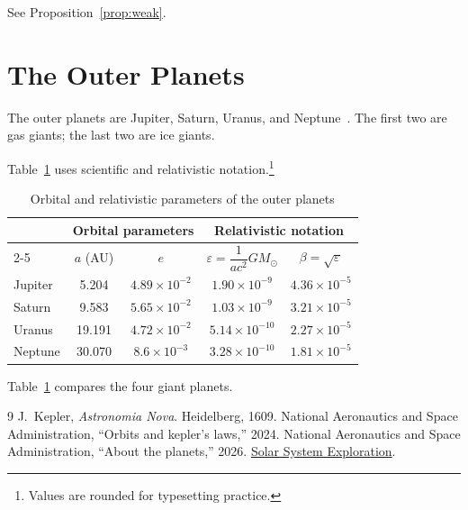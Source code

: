 \documentclass[10pt]{article}
\begin{document}
See Proposition~\ref{prop:weak}.

\section{The Outer Planets}
The outer planets are Jupiter, Saturn, Uranus, and
Neptune~\cite{nasa-planets}. The first two are gas giants; the last two
are ice giants.

Table~\ref{tab:outer} uses scientific and relativistic
notation.\footnote{Values are rounded for typesetting practice.}

\begin{table}[htbp]
  \centering
  \caption{Orbital and relativistic parameters of the outer planets}
  \label{tab:outer}
  \renewcommand{\arraystretch}{1.5}
  \begin{tabular}{|l|cc|cc|}
    \hline
    \rowcolor{Gray!35}
    \multirow{2}{*}{\textbf{Planet}}
      & \multicolumn{2}{c|}{\textbf{Orbital parameters}}
      & \multicolumn{2}{c|}{\textbf{Relativistic notation}} \\
    \cline{2-5}
    \rowcolor{Gray!20}
      & $a$ (AU) & $e$
      & $\varepsilon = \dfrac{1}{a c^{2}} G M_{\odot}$
      & $\beta = \sqrt{\varepsilon}$ \\
    \hline
    \rowcolor{Yellow!15} Jupiter & 5.204  & $4.89\times10^{-2}$ & $1.90\times10^{-9}$  & $4.36\times10^{-5}$ \\
    \rowcolor{Yellow!25} Saturn  & 9.583  & $5.65\times10^{-2}$ & $1.03\times10^{-9}$  & $3.21\times10^{-5}$ \\
    \rowcolor{Cyan!15}   Uranus  & 19.191 & $4.72\times10^{-2}$ & $5.14\times10^{-10}$ & $2.27\times10^{-5}$ \\
    \rowcolor{Cyan!25}   Neptune & 30.070 & $8.6\times10^{-3}$  & $3.28\times10^{-10}$ & $1.81\times10^{-5}$ \\
    \hline
  \end{tabular}
\end{table}

Table~\ref{tab:outer} compares the four giant planets.

\begin{thebibliography}{9}
   J.~Kepler, \textit{Astronomia Nova}. Heidelberg, 1609.
   National Aeronautics and Space Administration,
    ``Orbits and kepler's laws,'' 2024.
   National Aeronautics and Space Administration,
    ``About the planets,'' 2026.
    \href{https://solarsystem.nasa.gov/}{Solar System Exploration}.
\end{thebibliography}
\end{document}
